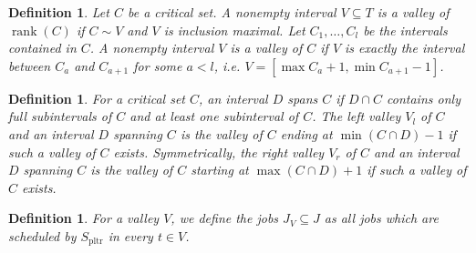 \documentclass[a4paper]{article}
\DeclareMathOperator{\pltr}{pltr}
\DeclareMathOperator{\rank}{rank}
\newtheorem{definition}[theorem]{Definition}
\begin{document}
\begin{definition}
  Let $C$ be a critical set. A nonempty interval $V \subseteq T$ is a \emph{valley of $\rank(C)$} if $C \sim V$ and $V$ is inclusion maximal.
  Let $C_1, \ldots, C_l$ be the intervals contained in $C$.
  A nonempty interval $V$ is a \emph{valley of $C$} if $V$ is exactly the interval between $C_{a}$ and $C_{a+1}$ for some $a < l$, i.e. $V = [\max C_a + 1, \min C_{a+1} - 1]$.
\end{definition}
\begin{definition}
  For a critical set $C$, an interval $D$ \emph{spans} $C$ if $D \cap C$ contains only full subintervals of $C$ and at least one subinterval of $C$.
  The \emph{left valley} $V_l$ of $C$ and an interval $D$ spanning $C$ is the valley of $C$ ending at $\min (C \cap D) - 1$ if such a valley of $C$ exists.
  Symmetrically, the \emph{right valley} $V_r$ of $C$ and an interval $D$ spanning $C$ is the valley of $C$ starting at $\max (C \cap D) + 1$ if such a valley of $C$ exists.
\end{definition}

\begin{definition}
  For a valley $V$, we define the jobs $J_V \subseteq J$ as all jobs which are scheduled by $S_{\pltr}$ in every $t \in V$.
\end{definition}
\end{document}
